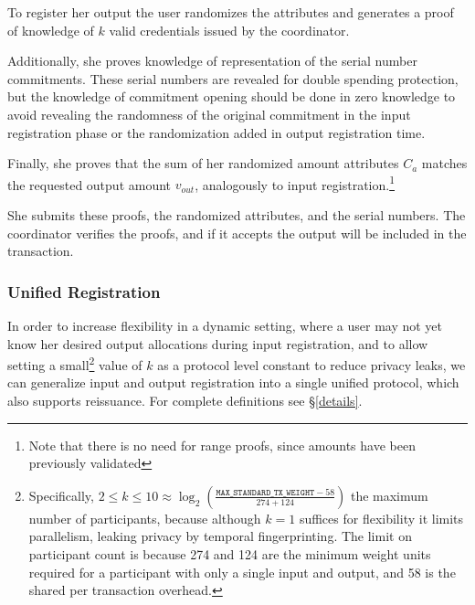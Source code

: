\documentclass{article}
\begin{document}
To register her output the user randomizes the attributes and generates a proof of knowledge of $k$ valid credentials issued by the coordinator.

Additionally, she proves knowledge of representation of the serial number commitments. These serial numbers are revealed for double spending protection, but the knowledge of commitment opening should be done in zero knowledge to avoid revealing the randomness of the original commitment in the input registration phase or the randomization added in output registration time.

Finally, she proves that the sum of her randomized amount attributes $C_a$ matches the requested output amount $v_{\mathit{out}}$, analogously to input registration.\footnote{Note that there is no need for range proofs, since amounts have been previously validated}

She submits these proofs, the randomized attributes, and the serial numbers. The coordinator verifies the proofs, and if it accepts the output will be included in the transaction.

\subsubsection{Unified Registration}\label{unified}

In order to increase flexibility in a dynamic setting, where a user may not yet know her desired output allocations during input registration, and to allow setting a small\footnote{Specifically, $2 \le k \le 10 \approx \log_2\left(\frac{\mathtt{MAX\_STANDARD\_TX\_WEIGHT} - 58}{274 + 124}\right)$ the maximum number of participants, because although $k=1$ suffices for flexibility it limits parallelism, leaking privacy by temporal fingerprinting. The limit on participant count is because 274 and 124 are the minimum weight units required for a participant with only a single input and output, and 58 is the shared per transaction overhead.} value of $k$ as a protocol level constant to reduce privacy leaks, we can generalize input and output registration into a single unified protocol, which also supports reissuance. 
For complete definitions see \S\ref{details}.
\end{document}
